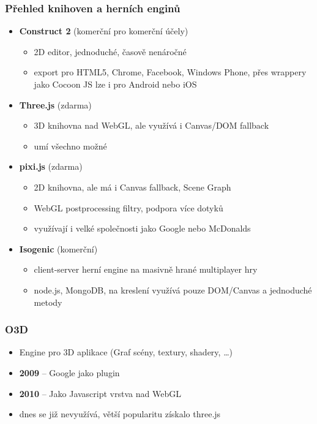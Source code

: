 \documentclass{beamer}
\begin{document}
		\begin{frame}[t,fragile]
		\frametitle{Přehled knihoven a herních enginů}					
		\begin{itemize}
		
		\item \textbf{Construct 2} (komerční pro komerční účely)
		\begin{itemize}
			\item 2D editor, jednoduché, časově nenáročné
			\item export pro HTML5, Chrome, Facebook, Windows Phone, přes wrappery jako Cocoon JS lze i pro Android nebo iOS
		\end{itemize}				
		\item \textbf{Three.js} (zdarma)
		\begin{itemize}
			\item 3D knihovna nad WebGL, ale využívá i Canvas/DOM fallback
			\item umí všechno možné			
		\end{itemize}				
		\item \textbf{pixi.js} (zdarma)
		\begin{itemize}
			\item 2D knihovna, ale má i Canvas fallback, Scene Graph
			\item WebGL postprocessing filtry, podpora více dotyků
			\item využívají i velké společnosti jako Google nebo McDonalds		
		\end{itemize}						
		\item \textbf{Isogenic} (komerční)
		\begin{itemize}
			\item client-server herní engine na masivně hrané multiplayer hry
			\item node.js, MongoDB, na kreslení využívá pouze DOM/Canvas a jednoduché metody		
		\end{itemize}				
		\end{itemize}	

	\end{frame}
	
	
		\begin{frame}[t,fragile]
		\frametitle{O3D}					
		\begin{itemize}
		
		\item Engine pro 3D aplikace (Graf scény, textury, shadery, …)
		\item \textbf{2009} – Google jako plugin
		\item \textbf{2010} – Jako Javascript vrstva nad WebGL
		\item dnes se již nevyužívá, větší popularitu získalo three.js
		\end{itemize}	

	\end{frame}
	
\end{document}
